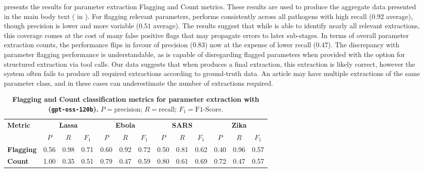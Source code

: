  presents the results for parameter extraction Flagging and Count metrics. These results are used to produce the aggregate data presented in the main body text ( in ). For flagging relevant parameters, \name{} performs consistently across all pathogens with high recall ($0.92$ average), though precision is lower and more variable ($0.51$ average). The results suggest that while \name{} is able to identify nearly all relevant extractions, this coverage comes at the cost of many false positive flags that may propagate errors to later sub-stages. In terms of overall parameter extraction counts, the performance flips in favour of precision ($0.83$) now at the expense of lower recall ($0.47$). The discrepancy with parameter flagging performance is understandable, as \name{} is capable of disregarding flagged parameters when provided with the option for structured extraction via tool calls. Our data suggests that when \name{} produces a final extraction, this extraction is likely correct, however the system often fails to produce all required extractions according to ground-truth data. An article may have multiple extractions of the same parameter class, and in these cases \name{} can underestimate the number of extractions required.

\begin{table}[h]

\centering
\caption{\textbf{Flagging and Count classification metrics for parameter extraction with \name{} (\texttt{gpt-oss-120b}).} $P=\text{precision}$; $R=\text{recall}$; $F_1=\text{F1-Score}$.}
\label{tab:parameters_extended_flagging_count}
\renewcommand{\arraystretch}{1}
{\footnotesize
\begin{tabular}{l|cccccccccccc}
\toprule
\bf Metric & \multicolumn{3}{c}{\textbf{Lassa}} & \multicolumn{3}{c}{\textbf{Ebola}} & \multicolumn{3}{c}{\textbf{SARS}} & \multicolumn{3}{c}{\textbf{Zika}} \\
 & $P$ & $R$ & $F_1$ & $P$ & $R$ & $F_1$ & $P$ & $R$ & $F_1$ & $P$ & $R$ & $F_1$ \\
\midrule
\bf Flagging & 0.56 &
0.98 &
0.71 &
0.60 &
0.92 &
0.72 &
0.50 &
0.81 &
0.62 &
0.40 &
0.96 &
0.57 \\
\midrule
\bf Count & 1.00 &
0.35 &
0.51 &
0.79 &
0.47 &
0.59 &
0.80 &
0.61 &
0.69 &
0.72 &
0.47 &
0.57 \\
\bottomrule
\end{tabular}
}
\end{table}


